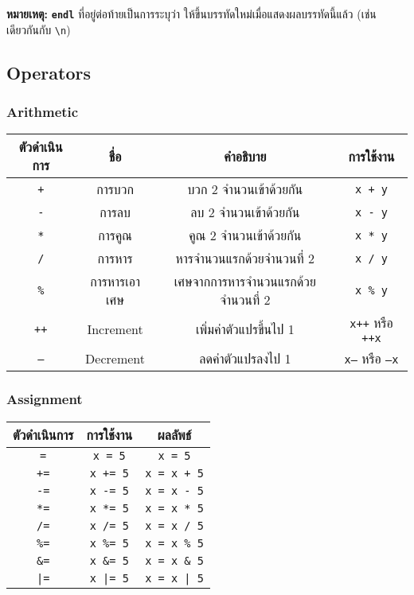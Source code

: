 \noindent\textbf{หมายเหตุ:} \textbf{\texttt{endl}} ที่อยู่ต่อท้ายเป็นการระบุว่า ให้ขึ้นบรรทัดใหม่เมื่อแสดงผลบรรทัดนี้แล้ว (เช่นเดียวกันกับ \texttt{\textbackslash n})

\newpage
\subsection{Operators}
\subsubsection{Arithmetic}
\begin{center}
\begin{tabular}{||c|c|c|c||}
\hline
\textbf{ตัวดำเนินการ} & \textbf{ชื่อ} & \textbf{คำอธิบาย} & \textbf{การใช้งาน} \\
\hline
\texttt{+} & การบวก & บวก 2 จำนวนเข้าด้วยกัน & \texttt{x + y} \\
\texttt{-} & การลบ & ลบ 2 จำนวนเข้าด้วยกัน & \texttt{x - y} \\
\texttt{*} & การคูณ & คูณ 2 จำนวนเข้าด้วยกัน & \texttt{x * y} \\
\texttt{/} & การหาร & หารจำนวนแรกด้วยจำนวนที่ 2 & \texttt{x / y} \\
\texttt{\%} & การหารเอาเศษ & เศษจากการหารจำนวนแรกด้วยจำนวนที่ 2 & \texttt{x \% y} \\
\texttt{++} & Increment & เพิ่มค่าตัวแปรขึ้นไป 1 & \texttt{x++} หรือ \texttt{++x} \\
\texttt{--} & Decrement & ลดค่าตัวแปรลงไป 1 & \texttt{x--} หรือ \texttt{--x} \\
\hline
\end{tabular}
\end{center}
\subsubsection{Assignment}
\begin{center}
\begin{tabular}{||c|c|c||}
\hline
\textbf{ตัวดำเนินการ} & \textbf{การใช้งาน} & \textbf{ผลลัพธ์} \\
\hline
\texttt{=} & \texttt{x = 5} & \texttt{x = 5} \\
\texttt{+=} & \texttt{x += 5} & \texttt{x = x + 5} \\
\texttt{-=} & \texttt{x -= 5} & \texttt{x = x - 5} \\
\texttt{*=} & \texttt{x *= 5} & \texttt{x = x * 5} \\
\texttt{/=} & \texttt{x /= 5} & \texttt{x = x / 5} \\
\texttt{\%=} & \texttt{x \%= 5} & \texttt{x = x \% 5} \\
\texttt{\&=} & \texttt{x \&= 5} & \texttt{x = x \& 5} \\
\texttt{|=} & \texttt{x |= 5} & \texttt{x = x | 5} \\
\hline
\end{tabular}
\end{center}
